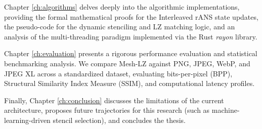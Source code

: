 Chapter \ref{ch:algorithms} delves deeply into the algorithmic implementations, providing the formal mathematical proofs for the Interleaved rANS state updates, the pseudo-code for the dynamic stenciling and LZ matching logic, and an analysis of the multi-threading paradigm implemented via the Rust \textit{rayon} library. 

Chapter \ref{ch:evaluation} presents a rigorous performance evaluation and statistical benchmarking analysis. We compare Mesh-LZ against PNG, JPEG, WebP, and JPEG XL across a standardized dataset, evaluating bits-per-pixel (BPP), Structural Similarity Index Measure (SSIM), and computational latency profiles. 

Finally, Chapter \ref{ch:conclusion} discusses the limitations of the current architecture, proposes future trajectories for this research (such as machine-learning-driven stencil selection), and concludes the thesis.
